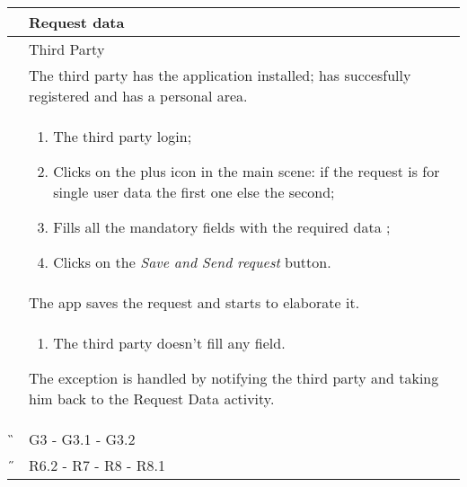 \begin{center}
	\begin{longtable}{ | p{} | p{} | }
		\hline
		 \A &  Request data\\ 

		\hline
		 \B &  Third Party \\ 

		\hline
  		 \C &  The third party has the application installed; has succesfully registered and has a personal area.\\

		\hline
		\D & \begin{enumerate}
			\item The third party login;
			\item Clicks on the plus icon in the main scene: if the request is for single user data the first one else the second;
			\item Fills all the mandatory fields with the required data  ;
			\item Clicks on the \textit{Save and Send request} button.
		\end{enumerate} \\

		\hline
		\E & The app saves the request and starts to elaborate it.\\

		\hline
		\F & \begin{enumerate}
			\item The third party doesn't fill any field.
		\end{enumerate} The exception is handled by notifying the third party and taking him back to the Request Data activity. \\
		
		\hline
		\G & G3 - G3.1 - G3.2\\

		\hline
		\H & R6.2 - R7 - R8 - R8.1 \\
		\hline

	\end{longtable}
\end{center}